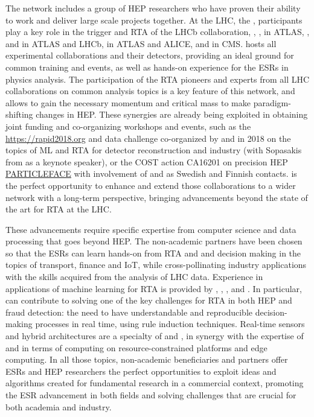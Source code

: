 The \acronym network includes a group of HEP researchers who have proven their ability to work and deliver large scale projects together. 
At the LHC, the \dortmundentity, \santiagoentity participants play a key role in the trigger and RTA of the LHCb collaboration, \ohioentity, \pisaentity, \oregonentity in ATLAS, \cnrsentity, \nikhef and \heidelbergentity in ATLAS and LHCb, \lundentity in ATLAS and ALICE, \helsinkientity and \cernentity in CMS.
\cernentity hosts all experimental collaborations and their detectors, providing an ideal ground for common training and events, as well as hands-on experience for the ESRs in physics analysis. 
The participation of the RTA pioneers and experts from all LHC collaborations on common analysis topics is a key feature of this network, and allows to gain the necessary momentum and critical mass to make paradigm-shifting changes in HEP. 
These synergies are already being exploited in obtaining joint funding and co-organizing workshops and events, such as the \href{RAPID workshop}{https://rapid2018.org} and data challenge co-organized by \dortmundentity and \cnrsentity in 2018 on the topics of ML and RTA for detector reconstruction and industry (with Sopasakis from \ximantisentity as a keynote speaker), or the COST action CA16201 on precision HEP \href{https://particleface.eu}{PARTICLEFACE} with involvement of \lundentity and \helsinkientity as Swedish and Finnish contacts. 
\acronym is the perfect opportunity to enhance and extend those collaborations to a wider network with a long-term perspective, bringing advancements beyond the state of the art for RTA at the LHC. 

These advancements require specific expertise from computer science and data processing that goes beyond HEP. 
The non-academic partners have been chosen so that the ESRs can learn hands-on from RTA and and decision making in the topics of transport, finance and IoT, while cross-pollinating industry applications with the skills acquired from the analysis of LHC data. 
Experience in applications of machine learning for RTA is provided by \liegesentity, \uniboentity, \ibmentity, \ximantisentity and \pointeightentity. 
In particular, \ibmentity can contribute to solving one of the key challenges for RTA in both HEP and fraud detection: the need to have understandable and reproducible decision-making processes in real time, using rule induction techniques. 
Real-time sensors and hybrid architectures are a specialty of \lightboxentity and \fleetmaticsentity, in synergy with the expertise of \uniboentity and \sorbonneentity in terms of computing on resource-constrained platforms and edge computing. 
In all those topics, non-academic beneficiaries and partners offer ESRs and HEP researchers the perfect opportunities to exploit ideas and algorithms created for fundamental research in a commercial context, promoting the ESR advancement in both fields and solving challenges that are crucial for both academia and industry. 

